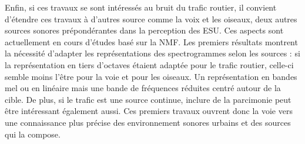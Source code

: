 Enfin, si ces travaux se sont intéressés au bruit du trafic routier, il convient d'étendre ces travaux à d'autres source comme la voix et les oiseaux, deux autres sources sonores prépondérantes dans la perception des ESU. Ces aspects sont actuellement en cours d'études basé sur la NMF. Les premiers résultats montrent la nécessité d'adapter les représentations des spectrogrammes selon les sources : si la représentation en tiers d'octaves étaient adaptée pour le trafic routier, celle-ci semble moins l'être pour la voie et pour les oiseaux. Un représentation en bandes mel ou en linéaire mais une bande de fréquences réduites centré autour de la cible. De plus, si le trafic est une source continue, inclure de la parcimonie peut être intéressant également aussi.
Ces premiers travaux ouvrent donc la voie vers une connaissance plus précise des environnement sonores urbains et des sources qui la compose.






